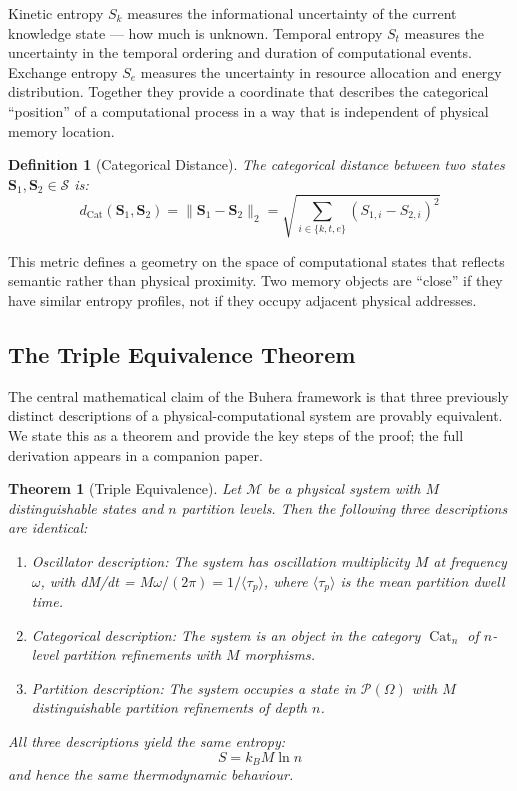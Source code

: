 \documentclass[12pt,twocolumn]{article}
\newtheorem{theorem}{Theorem}[section]
\newtheorem{definition}{Definition}[section]
\DeclareMathOperator{\Cat}{Cat}
\begin{document}
Kinetic entropy $S_k$ measures the informational uncertainty of the current knowledge state --- how much is unknown. Temporal entropy $S_t$ measures the uncertainty in the temporal ordering and duration of computational events. Exchange entropy $S_e$ measures the uncertainty in resource allocation and energy distribution. Together they provide a coordinate that describes the categorical ``position'' of a computational process in a way that is independent of physical memory location.

\begin{definition}[Categorical Distance]
The \emph{categorical distance} between two states $\mathbf{S}_1, \mathbf{S}_2 \in \mathcal{S}$ is:
\begin{equation}
d_{\Cat}(\mathbf{S}_1, \mathbf{S}_2) = \|\mathbf{S}_1 - \mathbf{S}_2\|_2 = \sqrt{\sum_{i \in \{k,t,e\}} (S_{1,i} - S_{2,i})^2}
\end{equation}
\end{definition}

This metric defines a geometry on the space of computational states that reflects semantic rather than physical proximity. Two memory objects are ``close'' if they have similar entropy profiles, not if they occupy adjacent physical addresses.

\subsection{The Triple Equivalence Theorem}
\label{sec:triple_equivalence}

The central mathematical claim of the Buhera framework is that three previously distinct descriptions of a physical-computational system are provably equivalent. We state this as a theorem and provide the key steps of the proof; the full derivation appears in a companion paper.

\begin{theorem}[Triple Equivalence]
\label{thm:triple_equivalence}
Let $\mathcal{M}$ be a physical system with $M$ distinguishable states and $n$ partition levels. Then the following three descriptions are identical:
\begin{enumerate}
\item \emph{Oscillator description}: The system has oscillation multiplicity $M$ at frequency $\omega$, with dM/dt = $M\omega/(2\pi) = 1/\langle\tau_p\rangle$, where $\langle\tau_p\rangle$ is the mean partition dwell time.
\item \emph{Categorical description}: The system is an object in the category $\Cat_n$ of $n$-level partition refinements with $M$ morphisms.
\item \emph{Partition description}: The system occupies a state in $\mathcal{P}(\Omega)$ with $M$ distinguishable partition refinements of depth $n$.
\end{enumerate}
All three descriptions yield the same entropy:
\begin{equation}
\label{eq:triple_entropy}
S = k_B M \ln n
\end{equation}
and hence the same thermodynamic behaviour.
\end{theorem}
\end{document}

